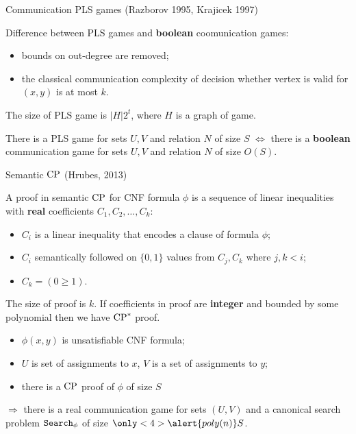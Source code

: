 \begin{frame}{Communication PLS games (Razborov 1995, Krajicek 1997)}

    Difference between PLS games and \textbf{boolean} coomunication games:
    \vspace{-5mm}
    \begin{itemize}
        \item bounds on out-degree are removed;
        \item the classical communication complexity of decision whether vertex is valid for $(x, y)$ is at most $k$.
    \end{itemize}

    The size of PLS game is $|H| 2^t$, where $H$ is a graph of game.

    \pause

    \begin{theorem}[S 2016, unp.]
        There is a PLS game for sets $U, V$ and relation $N$ of size $S$ $\Leftrightarrow$ there is a \textbf{boolean}
        communication game for sets $U, V$ and relation $N$ of size $O(S)$.
    \end{theorem}

\end{frame}


\begin{frame}{Semantic $\mathrm{CP}$ (Hrubes, 2013)}

    A proof in semantic $\mathrm{CP}$ for CNF formula $\phi$ is a sequence of linear inequalities with \textbf{real} coefficients
    $C_1, C_2, \dots, C_k$:
    \begin{itemize}
        \item $C_i$ is a linear inequality that encodes a clause of formula $\phi$;
        \item $C_i$ semantically followed on $\{0, 1\}$ values from $C_j, C_k$ where $j, k < i$;
        \item $C_k = (0 \ge 1)$.
    \end{itemize}

    \pause
    The size of proof is $k$. If coefficients in proof are \textbf{integer} and bounded by some polynomial then we have
    $\mathrm{CP}^*$ proof.

    \pause

    \begin{lemma}[S 2016, unp.]
        \begin{itemize}
            \item $\phi(x, y)$ is unsatisfiable CNF formula;
            \item $U$ is set of assignments to $x$, $V$ is a set of assignments to $y$;
            \item there is a $\mathrm{CP}$  proof of $\phi$ of size $S$
        \end{itemize}
        $\Rightarrow$ there is a real  communication game for sets $(U, V)$ and a canonical search
        problem $\mathtt{Search}_{\phi}$ of size $\only<4>{\alert{poly(n)}} S$.
    \end{lemma}

\end{frame}

